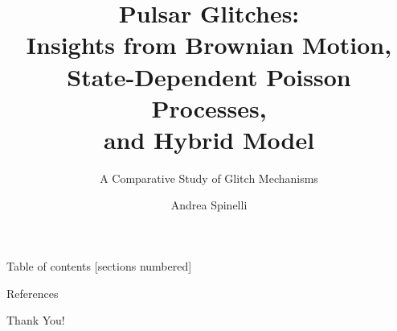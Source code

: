 \documentclass[11pt]{beamer}
\title[Pulsar Glitches]{Pulsar Glitches:\\ Insights from Brownian Motion,\\ State-Dependent Poisson Processes,\\ and Hybrid Model}
\subtitle{A Comparative Study of Glitch Mechanisms}
\date{}
\author{Andrea Spinelli}
\institute{University of Trieste}
\begin{document}
\maketitle

\begin{frame}{Table of contents}
  [sections numbered]
  \tableofcontents%
\end{frame}






\begin{frame}[allowframebreaks]{References}

  
  
  
\end{frame}

{
\begin{frame}[standout]
  \fontsize{18pt}{16pt}\selectfont
  Thank You!
\end{frame}
}
\end{document}
